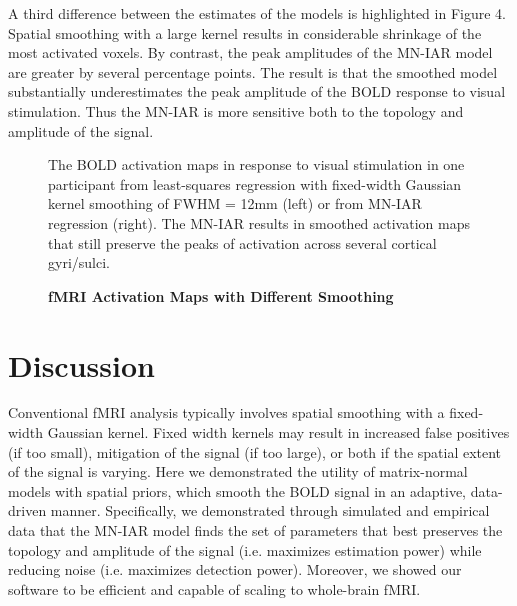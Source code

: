 \documentclass[9pt]{NEU560-final}
\begin{document}
A third difference between the estimates of the models is highlighted in Figure 4. Spatial smoothing with a large kernel results in considerable shrinkage of the most activated voxels. By contrast, the peak amplitudes of the MN-IAR model are greater by several percentage points. The result is that the smoothed model substantially underestimates the peak amplitude of the BOLD response to visual stimulation. Thus the MN-IAR is  more sensitive both to the topology and amplitude of the signal.
\begin{figure}
\centerline{%
%
}
\caption{\textbf{fMRI Activation Maps with Different Smoothing}}
\par The BOLD activation maps in response to visual stimulation in one participant from least-squares regression with fixed-width Gaussian kernel smoothing of FWHM = 12mm (left) or from MN-IAR regression (right). The MN-IAR results in smoothed activation maps that still preserve the peaks of activation across several cortical gyri/sulci. 
\end{figure}

\section{Discussion}
Conventional fMRI analysis typically involves spatial smoothing with a fixed-width Gaussian kernel. Fixed width kernels may result in increased false positives (if too small), mitigation of the signal (if too large), or both if the spatial extent of the signal is varying. Here we demonstrated the utility of matrix-normal models with spatial priors, which smooth the BOLD signal in an adaptive, data-driven manner. Specifically, we demonstrated through simulated and empirical data that the MN-IAR model finds the set of parameters that best preserves the topology and amplitude of the signal (i.e. maximizes estimation power) while reducing noise (i.e. maximizes detection power). Moreover, we showed our software to be efficient and capable of scaling to whole-brain fMRI.
\end{document}
